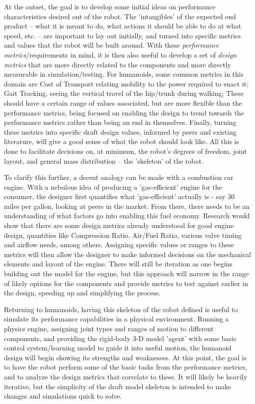 \documentclass{article}
\begin{document}
At the outset, the goal is to develop some initial ideas on performance characteristics desired out of the robot. The 'intangibles' of the expected end product -- what it is meant to do, what actions it should be able to do at what speed, etc. -- are important to lay out initially, and turned into specific metrics and values that the robot will be built around. With these \textit{performance metrics}/requirements in mind, it is then also useful to develop a set of \textit{design metrics} that are more directly related to the components and more directly measurable in simulation/testing. For humanoids, some common metrics in this domain are Cost of Transport relating mobility to the power required to enact it; Gait Tracking, seeing the vertical travel of the hip/trunk during walking; %
These should have a certain range of values associated, but are more flexible than the performance metrics, being focused on enabling the design to trend towards the performance metrics rather than being an end in themselves. Finally, turning these metrics into specific draft design values, informed by peers and existing literature, will give a good sense of what the robot should look like.  All this is done to facilitate decisions on, at minimum, the robot's degrees of freedom, joint layout, and general mass distribution -- the 'skeleton' of the robot.

To clarify this further, a decent analogy can be made with a combustion car engine. With a nebulous idea of producing a 'gas-efficient' engine for the consumer, the designer first quantifies what 'gas-efficient' actually is - say 30 miles per gallon, looking at peers in the market. From there, there needs to be an understanding of what factors go into enabling this fuel economy. Research would show that there are some design metrics already understood for good engine design, quantities like Compression Ratio, Air/Fuel Ratio, various valve timing and airflow needs, among others. Assigning specific values or ranges to these metrics will then allow the designer to make informed decisions on the mechanical elements and layout of the engine. There will still be iteration as one begins building out the model for the engine, but this approach will narrow in the range of likely options for the components and provide metrics to test against earlier in the design, speeding up and simplifying the process.

Returning to humanoids, having this skeleton of the robot defined is useful to simulate its performance capabilities in a physical environment. Running a physics engine, assigning joint types and ranges of motion to different components, and providing the rigid-body 3-D model 'agent' with some basic control system/learning model to guide it into useful motion, the humanoid design will begin showing its strengths and weaknesses. At this point, the goal is to have the robot perform some of the basic tasks from the performance metrics, and to analyze the design metrics that correlate to these. It will likely be heavily iterative, but the simplicity of the draft model skeleton is intended to make changes and simulations quick to solve.
\end{document}
